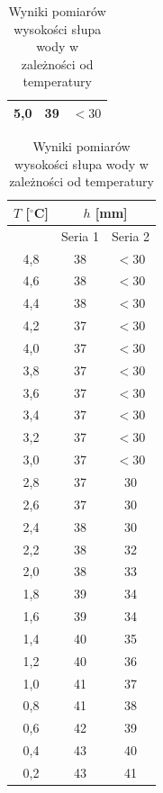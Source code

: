 \documentclass[a4paper,12pt]{article}
\begin{document}
\begin{table}[H]
\begin{minipage}{0.48\textwidth}
\begin{tabular}{|c|c|c|}
            5{,}0  & 39 & $<30$ \\
            \hline
        \end{tabular}
    \end{minipage}
    \hfill
    \begin{minipage}{0.48\textwidth}
        \centering
        \begin{tabular}{|c|c|c|}
            \hline
            $T$ [$^\circ$C] & \multicolumn{2}{c|}{$h$ [mm]} \\
            \hline
            & Seria 1 & Seria 2 \\
            \hline
            4{,}8  & 38 & $<30$ \\
            4{,}6  & 38 & $<30$ \\
            4{,}4  & 38 & $<30$ \\
            4{,}2  & 37 & $<30$ \\
            4{,}0  & 37 & $<30$ \\
            3{,}8  & 37 & $<30$ \\
            3{,}6  & 37 & $<30$ \\
            3{,}4  & 37 & $<30$ \\
            3{,}2  & 37 & $<30$ \\
            3{,}0  & 37 & $<30$ \\
            2{,}8  & 37 & 30 \\
            2{,}6  & 37 & 30 \\
            2{,}4  & 38 & 30 \\
            2{,}2  & 38 & 32 \\
            2{,}0  & 38 & 33 \\
            1{,}8  & 39 & 34 \\
            1{,}6  & 39 & 34 \\
            1{,}4  & 40 & 35 \\
            1{,}2  & 40 & 36 \\
            1{,}0  & 41 & 37 \\
            0{,}8  & 41 & 38 \\
            0{,}6  & 42 & 39 \\
            0{,}4  & 43 & 40 \\
            0{,}2  & 43 & 41 \\
            \hline
        \end{tabular}
    \end{minipage}
    \caption{Wyniki pomiarów wysokości słupa wody w zależności od temperatury}
    \label{tab:pomiary_wysokosci}
\end{table}
\end{document}
